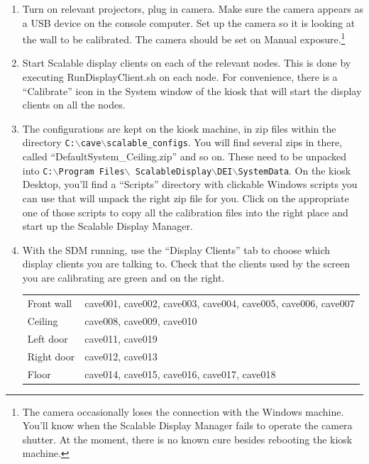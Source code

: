 \documentclass[11pt]{article}
\begin{document}
\begin{enumerate}

\item Turn on relevant projectors, plug in camera.  Make sure the camera
  appears as a USB device on the console computer.  Set up the camera
  so it is looking at the wall to be calibrated.  The camera should be
  set on Manual exposure.\footnote{The camera occasionally loses the
    connection with the Windows machine.  You'll know when the
    Scalable Display Manager fails to operate the camera shutter.  At
    the moment, there is no known cure besides rebooting the kiosk
    machine.} 

\item Start Scalable display clients on each of the relevant nodes.
  This is done by executing RunDisplayClient.sh on each node.  For
  convenience, there is a ``Calibrate'' icon in the System window of
  the kiosk that will start the display clients on all the nodes.

\newcommand{\bs}{$\backslash$}
\item The configurations are kept on the kiosk machine, in zip files
  within the directory \hbox{\texttt{C:\bs cave\bs scalable\_configs}}.  You will find several zips in
  there, called ``DefaultSystem\_Ceiling.zip'' and so on.  These need to be
  unpacked into \hbox{\texttt{C:\bs Program Files\bs
      ScalableDisplay\bs DEI\bs SystemData}}.  On the kiosk Desktop,
  you'll find a ``Scripts'' directory with clickable Windows scripts
  you can use that will unpack the right zip file for you.  Click on
  the appropriate one of 
  those scripts to copy all the calibration files into the right
  place and start up the Scalable Display Manager.

\item With the SDM running, use the ``Display Clients'' tab to choose
  which display clients you are talking to.  Check that the clients
  used by the screen you are calibrating are 
  green and on the right. 

  \begin{center}
  \begin{tabular}{ll}
    Front wall & cave001, cave002, cave003, cave004, cave005, cave006,
                 cave007 \\
    Ceiling & cave008, cave009, cave010 \\
    Left door & cave011, cave019 \\
    Right door & cave012, cave013 \\
    Floor & cave014, cave015, cave016, cave017, cave018 \\ 
  \end{tabular}
\end{center}


\end{enumerate}
\end{document}
